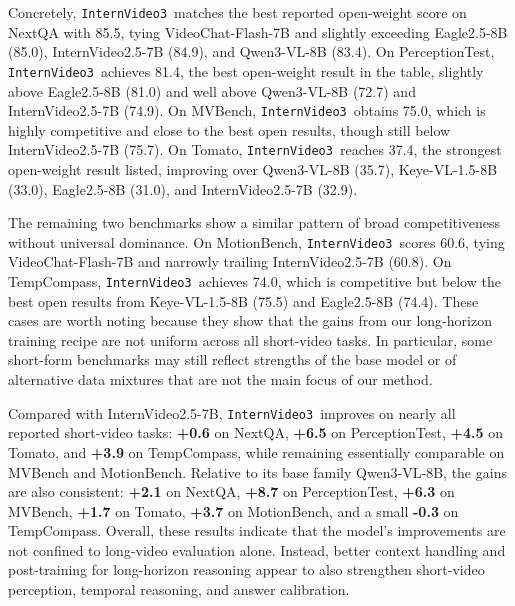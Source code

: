 \documentclass[11pt, letterpaper]{template}
\theoremstyle{plain}
\theoremstyle{definition}
\theoremstyle{remark}
\newcommand{\name}{\texttt{InternVideo3}\xspace}
\begin{document}
Concretely, \name\ matches the best reported open-weight score on NextQA with 85.5, tying VideoChat-Flash-7B and slightly exceeding Eagle2.5-8B (85.0), InternVideo2.5-7B (84.9), and Qwen3-VL-8B (83.4). On PerceptionTest, \name\ achieves 81.4, the best open-weight result in the table, slightly above Eagle2.5-8B (81.0) and well above Qwen3-VL-8B (72.7) and InternVideo2.5-7B (74.9). On MVBench, \name\ obtains 75.0, which is highly competitive and close to the best open results, though still below InternVideo2.5-7B (75.7). On Tomato, \name\ reaches 37.4, the strongest open-weight result listed, improving over Qwen3-VL-8B (35.7), Keye-VL-1.5-8B (33.0), Eagle2.5-8B (31.0), and InternVideo2.5-7B (32.9).

The remaining two benchmarks show a similar pattern of broad competitiveness without universal dominance. On MotionBench, \name\ scores 60.6, tying VideoChat-Flash-7B and narrowly trailing InternVideo2.5-7B (60.8). On TempCompass, \name\ achieves 74.0, which is competitive but below the best open results from Keye-VL-1.5-8B (75.5) and Eagle2.5-8B (74.4). These cases are worth noting because they show that the gains from our long-horizon training recipe are not uniform across all short-video tasks. In particular, some short-form benchmarks may still reflect strengths of the base model or of alternative data mixtures that are not the main focus of our method.

Compared with InternVideo2.5-7B, \name\ improves on nearly all reported short-video tasks: \textbf{+0.6} on NextQA, \textbf{+6.5} on PerceptionTest, \textbf{+4.5} on Tomato, and \textbf{+3.9} on TempCompass, while remaining essentially comparable on MVBench and MotionBench. Relative to its base family Qwen3-VL-8B, the gains are also consistent: \textbf{+2.1} on NextQA, \textbf{+8.7} on PerceptionTest, \textbf{+6.3} on MVBench, \textbf{+1.7} on Tomato, \textbf{+3.7} on MotionBench, and a small \textbf{-0.3} on TempCompass. Overall, these results indicate that the model's improvements are not confined to long-video evaluation alone. Instead, better context handling and post-training for long-horizon reasoning appear to also strengthen short-video perception, temporal reasoning, and answer calibration.
\end{document}
